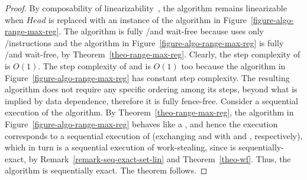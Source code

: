 \begin{proof}
By composability of linearizability~\cite{DBLP_journals_toplas_HerlihyW90}, the algorithm remains linearizable when \(Head\) is replaced with an instance of the algorithm in Figure~\ref{figure-algo-range-max-reg}.  The algorithm is fully \R/\W and wait-free because \Put uses only \R/\W instructions and the \RangeMaxReg algorithm in Figure~\ref{figure-algo-range-max-reg} is fully \R/\W and wait-free, by Theorem~\ref{theo-range-max-reg}.  Clearly, the step complexity of \Put is $O(1)$.  The step complexity of \Take and \Steal is $O(1)$ too because the \RangeMaxReg algorithm in Figure~\ref{figure-algo-range-max-reg} has constant step complexity.  The resulting algorithm does not require any specific ordering among its steps, beyond what is implied by data dependence, therefore it is fully fence-free. Consider a sequential execution of the algorithm.  By Theorem~\ref{theo-range-max-reg}, the algorithm in Figure~\ref{figure-algo-range-max-reg} behaves like a \MaxReg, and hence the execution corresponds to a sequential execution of \WFWSM (exchanging \RMaxR and \RMaxW with \MaxR and \MaxW, respectively), which in turn is a sequential execution of work-stealing, since \WFWSM is sequentially-exact, by Remark~\ref{remark-seq-exact-set-lin} and Theorem~\ref{theo-wf}.  Thus, the algorithm is sequentially exact. The theorem follows.
\end{proof}

